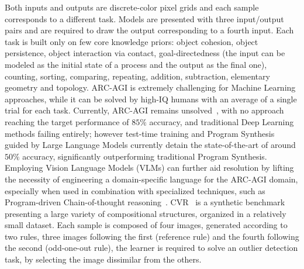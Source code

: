 Both inputs and outputs are discrete-color pixel grids and each sample corresponds to a different task.
Models are presented with three input/output pairs and are required to draw the output corresponding to a fourth input.
Each task is built only on few core knowledge priors: object cohesion, object persistence, object interaction via contact, goal-directedness (the input can be modeled as the initial state of a process and the output as the final one), counting, sorting, comparing, repeating, addition, subtraction, elementary geometry and topology.
ARC-AGI is extremely challenging for Machine Learning approaches, while it can be solved by high-IQ humans with an average of a single trial for each task.
%
Currently, ARC-AGI remains unsolved~\cite{chollet2024arc}, with no approach reaching the target performance of $85\%$ accuracy, and traditional Deep Learning methods failing entirely; however test-time training and Program Synthesis guided by Large Language Models currently detain the state-of-the-art of around $50\%$ accuracy, significantly outperforming traditional Program Synthesis. Employing Vision Language Models (VLMs) can further aid resolution by lifting the necessity of engineering a domain-specific language for the ARC-AGI domain, especially when used in combination with specialized techniques, such as Program-driven Chain-of-thought reasoning~\cite{lyu2023faithful}.
CVR~\cite{zerroug2022benchmark} is a synthetic benchmark presenting a large variety of compositional structures, organized in a relatively small dataset.
Each sample is composed of four images, generated according to two rules, three images following the first (reference rule) and the fourth following the second (odd-one-out rule), the learner is required to solve an outlier detection task, by selecting the image dissimilar from the others.
